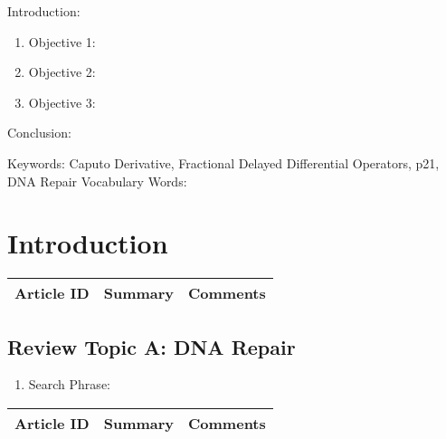 

\twocolumn
\scriptsize
\begin{frontmatter}
		\title{}
		\author{}
		\address{The Mathematical Learning Space}
\end{frontmatter}	

Introduction:
\begin{enumerate}
\item Objective 1:
\item Objective 2:
\item Objective 3:
\end{enumerate}
Conclusion:

Keywords: Caputo Derivative, Fractional Delayed Differential Operators, p21, DNA Repair
Vocabulary Words:

\section{Introduction}

\begin{table}[H]\centering
	\begin{tabular}{p{1cm}p{4cm}p{3cm}}
		Article ID & Summary & Comments\\
		\hline
		\hline
	\end{tabular}
\end{table}

\subsection{Review Topic A: DNA Repair}

\begin{enumerate}
	\item Search Phrase: \cite{key1}
\end{enumerate}

\begin{table}[H]\centering
	\begin{tabular}{p{1cm}p{4cm}p{3cm}}
		Article ID & Summary & Comments\\
		\hline
		\hline
	\end{tabular}
\end{table}

